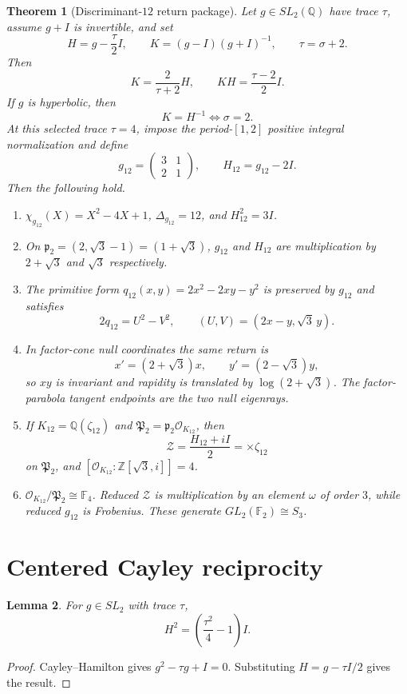 \documentclass[11pt]{article}
\newtheorem{theorem}{Theorem}[section]
\newtheorem{lemma}[theorem]{Lemma}
\theoremstyle{remark}
\newcommand{\Q}{\mathbb Q}
\newcommand{\Z}{\mathbb Z}
\newcommand{\F}{\mathbb F}
\newcommand{\OO}{\mathcal O}
\begin{document}
\begin{theorem}[Discriminant-$12$ return package]
\label{thm:main}
Let $g\in SL_2(\Q)$ have trace $\tau$, assume $g+I$ is invertible, and set
\[
H=g-\frac\tau2I,
\qquad K=(g-I)(g+I)^{-1},
\qquad \tau=\sigma+2.
\]
Then
\[
K=\frac{2}{\tau+2}H,
\qquad KH=\frac{\tau-2}{2}I.
\]
If $g$ is hyperbolic, then
\[
K=H^{-1}\iff\sigma=2.
\]
At this selected trace $\tau=4$, impose the period-$[1,2]$ positive integral
normalization and define
\[
g_{12}=\begin{pmatrix}3&1\\2&1\end{pmatrix},
\qquad
H_{12}=g_{12}-2I.
\]
Then the following hold.
\begin{enumerate}[label=(\roman*)]
\item $\chi_{g_{12}}(X)=X^2-4X+1$, $\Delta_{g_{12}}=12$, and
$H_{12}^2=3I$.
\item On $\mathfrak p_2=(2,\sqrt3-1)=(1+\sqrt3)$, $g_{12}$ and $H_{12}$
are multiplication by $2+\sqrt3$ and $\sqrt3$ respectively.
\item The primitive form $q_{12}(x,y)=2x^2-2xy-y^2$ is preserved by
$g_{12}$ and satisfies
\[
2q_{12}=U^2-V^2,
\qquad (U,V)=(2x-y,\sqrt3\,y).
\]
\item In factor-cone null coordinates the same return is
\[
x'=(2+\sqrt3)x,
\qquad y'=(2-\sqrt3)y,
\]
so $xy$ is invariant and rapidity is translated by $\log(2+\sqrt3)$.
The factor-parabola tangent endpoints are the two null eigenrays.
\item If $K_{12}=\Q(\zeta_{12})$ and
$\mathfrak P_2=\mathfrak p_2\OO_{K_{12}}$, then
\[
\mathcal Z=\frac{H_{12}+iI}{2}=\times\zeta_{12}
\]
on $\mathfrak P_2$, and
$[\OO_{K_{12}}:\Z[\sqrt3,i]]=4$.
\item $\OO_{K_{12}}/\mathfrak P_2\cong\F_4$.  Reduced $\mathcal Z$ is
multiplication by an element $\omega$ of order $3$, while reduced $g_{12}$ is
Frobenius.  These generate $GL_2(\F_2)\cong S_3$.
\end{enumerate}
\end{theorem}

\section{Centered Cayley reciprocity}

\begin{lemma}
For $g\in SL_2$ with trace $\tau$,
\[
H^2=\left(\frac{\tau^2}{4}-1\right)I.
\]
\end{lemma}
\begin{proof}
Cayley--Hamilton gives $g^2-\tau g+I=0$.  Substituting
$H=g-\tau I/2$ gives the result.
\end{proof}
\end{document}

